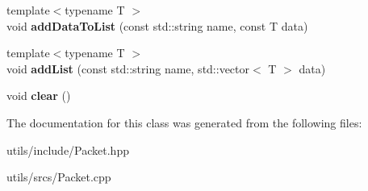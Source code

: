 \begin{DoxyCompactItemize}
\item 
\mbox{\label{classutils_1_1_packet_a7e60a3b763cda5855003bb36603fa73e}} 
{\footnotesize template$<$typename T $>$ }\\void {\bfseries add\+Data\+To\+List} (const std\+::string name, const T data)
\item 
\mbox{\label{classutils_1_1_packet_acbe9279b935384537850daa1b9a8c982}} 
{\footnotesize template$<$typename T $>$ }\\void {\bfseries add\+List} (const std\+::string name, std\+::vector$<$ T $>$ data)
\item 
\mbox{\label{classutils_1_1_packet_a583c5366ba6e32d1a4df8cb491e6dcd4}} 
void {\bfseries clear} ()
\end{DoxyCompactItemize}


The documentation for this class was generated from the following files\+:\begin{DoxyCompactItemize}
\item 
utils/include/Packet.\+hpp\item 
utils/srcs/Packet.\+cpp\end{DoxyCompactItemize}
